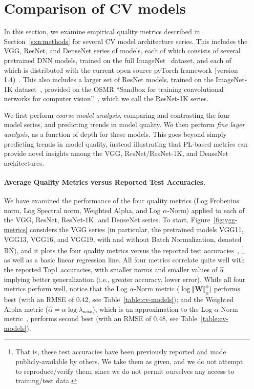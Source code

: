 \vspace{-1mm}
\section{Comparison of CV models}
\label{sxn:cv}

In this section, we examine empirical quality metrics described in Section~\ref{sxn:methods} for several CV model architecture series.
This includes the VGG, ResNet, and DenseNet series of models, each of which consists of several pretrained DNN models, trained on the full ImageNet~\cite{imagenet} dataset, and each of which is distributed with the current open source pyTorch framework (version 1.4)~\cite{pytorch}.
This also includes a larger set of ResNet models, trained on the ImageNet-1K dataset~\cite{imagenet}, provided on the OSMR ``Sandbox for training convolutional networks for computer vision''~\cite{osmr}, which we call the ResNet-1K series.

We first perform \emph{coarse model analysis}, comparing and contrasting the four model series, and predicting trends in model quality. 
We then perform \emph{fine layer analysis}, as a function of depth for these models.
This goes beyond simply predicting trends in model quality, instead illustrating that PL-based metrics can provide novel insights among the VGG, ResNet/ResNet-1K, and DenseNet architectures. 


\vspace{-1mm}
\paragraph{Average Quality Metrics versus Reported Test Accuracies.}

We have examined the performance of the four quality metrics (Log Frobenius norm, Log Spectral norm, Weighted Alpha, and Log $\alpha$-Norm) applied to each of the VGG, ResNet, ResNet-1K, and DenseNet series.
To start, Figure~\ref{fig:vgg-metrics} considers the VGG series (in particular, the pretrained models VGG11, VGG13, VGG16, and VGG19, with and without Batch Normalization, denoted BN), and it plots the four quality metrics versus the reported test accuracies~\cite{pytorch},%
\footnote{That is, these test accuracies have been previously reported and made publicly-available by others.  We take them as given, and we do not attempt to reproduce/verify them, since we do not permit ourselves any access to training/test data.}
as well as a basic linear regression line. 
All four metrics correlate quite well with the reported Top1 accuracies, with smaller norms and smaller values of $\hat{\alpha}$ implying better generalization (i.e., greater accuracy, lower error). 
While all four metrics perform well, notice that the Log $\alpha$-Norm metric ($\log\Vert\mathbf{W}\Vert_{\alpha}^{\alpha}$) performs best (with an RMSE of $0.42$, see Table~\ref{table:cv-models}); and the Weighted Alpha metric ($\hat\alpha =\alpha\log\lambda_{max} $), which is an approximation to the Log $\alpha$-Norm metric~\cite{MM20_unpub_work}, performs second best (with an RMSE of $0.48$, see Table~\ref{table:cv-models}).

